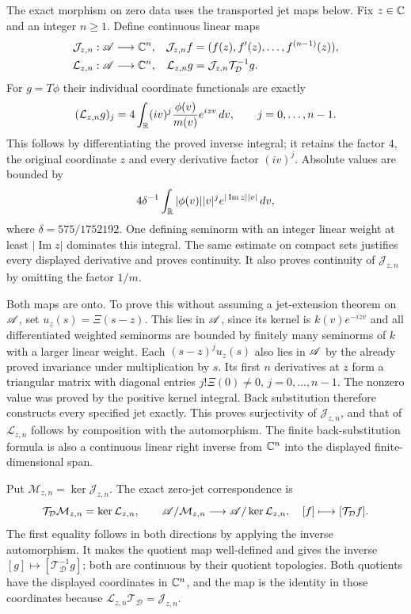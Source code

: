 The exact morphism on zero data uses the transported jet maps below.
Fix $z\in\mathbb C$ and an integer $n\ge1$. Define continuous linear maps
\begin{align*}
\mathcal J_{z,n}:\mathscr A&\longrightarrow\mathbb C^n,
&\mathcal J_{z,n}f&=(f(z),f'(z),\ldots,f^{(n-1)}(z)),\\
\mathcal L_{z,n}:\mathscr A&\longrightarrow\mathbb C^n,
&\mathcal L_{z,n}g&=\mathcal J_{z,n}\mathcal T_{\mathcal D}^{-1}g.
\end{align*}
For $g=T\phi$ their individual coordinate functionals are exactly
\begin{equation}
(\mathcal L_{z,n}g)_j
 =4\int_\mathbb R (iv)^j\frac{\phi(v)}{m(v)}e^{izv}\,dv,
\qquad j=0,\ldots,n-1.
\label{x4:transported-jets}
\end{equation}
This follows by differentiating the proved inverse integral; it retains
the factor $4$, the original coordinate $z$ and every derivative factor
$(iv)^j$. Absolute values are bounded by
\[
4\delta^{-1}\int_\mathbb R|\phi(v)||v|^j e^{|\operatorname{Im}z||v|}\,dv,
\]
where $\delta=575/1752192$. One defining seminorm with an integer
linear weight at least $|\operatorname{Im}z|$ dominates this integral.
The same estimate on compact sets justifies every displayed derivative
and proves continuity. It also proves continuity of $\mathcal J_{z,n}$
by omitting the factor $1/m$.

Both maps are onto. To prove this without assuming a jet-extension
theorem on $\mathscr A$, set $u_z(s)=\Xi(s-z)$. This lies in $\mathscr A$, since its
kernel is $k(v)e^{-izv}$ and all differentiated weighted seminorms
are bounded by finitely many seminorms of $k$ with a larger linear
weight. Each $(s-z)^ju_z(s)$ also lies in $\mathscr A$ by the already proved
invariance under multiplication by $s$. Its first $n$ derivatives at
$z$ form a triangular matrix with diagonal entries
$j!\Xi(0)\ne0$, $j=0,\ldots,n-1$. The nonzero value was proved by
the positive kernel integral. Back substitution therefore constructs
every specified jet exactly. This proves surjectivity of
$\mathcal J_{z,n}$, and that of $\mathcal L_{z,n}$ follows by
composition with the automorphism.
The finite back-substitution formula is also a continuous linear right
inverse from $\mathbb C^n$ into the displayed finite-dimensional span.

Put $\mathcal M_{z,n}=\ker\mathcal J_{z,n}$. The exact zero-jet
correspondence is
\[
\mathcal T_{\mathcal D}\mathcal M_{z,n}
 =\ker\mathcal L_{z,n},\qquad
\mathscr A/\mathcal M_{z,n}\longrightarrow
\mathscr A/\ker\mathcal L_{z,n},\quad
[f]\longmapsto[\mathcal T_{\mathcal D}f].
\]
The first equality follows in both directions by applying the inverse
automorphism. It makes the quotient map well-defined and gives the
inverse $[g]\mapsto[\mathcal T_{\mathcal D}^{-1}g]$; both are
continuous by their quotient topologies. Both quotients have the
displayed coordinates in $\mathbb C^n$, and the map is the identity in those
coordinates because
$\mathcal L_{z,n}\mathcal T_{\mathcal D}=\mathcal J_{z,n}$.

